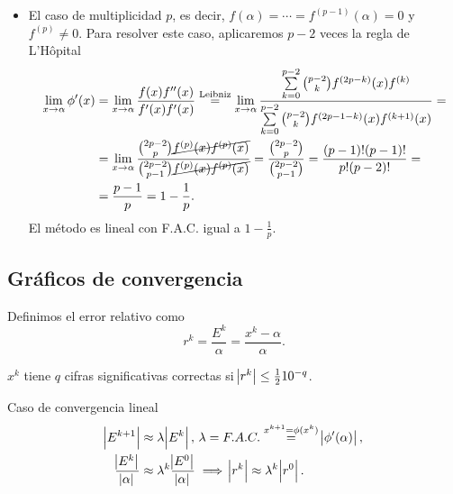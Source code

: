\begin{itemize}
    \item El caso de multiplicidad $p$, es decir, $f(\alpha) = \cdots = f^{(p-1)}(\alpha) = 0$ y
        $f^{(p)} \neq 0$. Para resolver este caso, aplicaremos $p-2$ veces la regla de L'Hôpital
        \[
            \begin{aligned}
                \lim_{x \to \alpha} \phi^\prime(x) &= \lim_{x \to \alpha} \frac{f(x)f^{\prime \prime}(x)}{f^\prime(x) f^\prime(x)}
                \stackrel{\text{Leibniz}}{=} \lim_{x \to \alpha} \frac{\sum\limits^{p-2}_{k = 0} {p-2 \choose k}
                f^{(2p-k)}(x)f^{(k)}}{\sum\limits^{p-2}_{k = 0} {p-2 \choose k }f^{(2p-1-k)}(x)f^{(k+1)}(x)} = \\
                &= \lim_{x \to \alpha} \frac{{2p-2 \choose p} \cancel{f^{(p)}(x)f^{(p)}(x)}}
                {{2p-2 \choose p-1}\cancel{f^{(p)}(x)f^{(p)}(x)}} =
                \frac{ {2p-2 \choose p} }{ {2p-2 \choose p-1} } = \frac{(p-1)!(p-1)!}{p!(p-2)!} = \\
                &= \frac{p-1}{p} = 1 - \frac{1}{p}.
            \end{aligned}
        \]
        El método es lineal con F.A.C. igual a $1 - \frac{1}{p}$.
\end{itemize}

\subsection{Gráficos de convergencia}

\begin{defi}
    Definimos el error relativo como
    \[
        r^k = \frac{E^k}{\alpha} = \frac{x^k - \alpha}{\alpha}.
    \]
\end{defi}
\begin{obs}
    $x^k$ tiene $q$ cifras significativas correctas si $\abs{r^k} \leq \frac{1}{2} 10^{-q}$.
\end{obs}
\noindent Caso de convergencia lineal
\begin{align*}
    \abs{E^{k+1}} &\approx \lambda \abs{E^k},\, \lambda = F.A.C. \stackrel{x^{k+1} = \phi(x^k)}{=} \abs{\phi'(\alpha)}, \\
    \frac{\abs{E^k}}{\abs{\alpha}} &\approx \lambda^k\frac{\abs{E^0}}{\abs{\alpha}} \implies \abs{r^k} \approx \lambda^k\abs{r^0}.
\end{align*}

